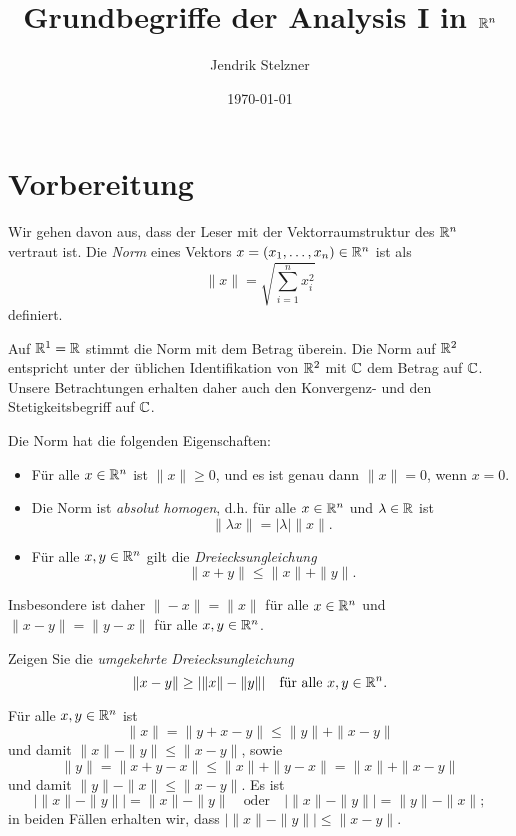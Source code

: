 \documentclass[a4paper,10pt]{article}
\title{Grundbegriffe der Analysis I in $\mathbb{R}^n$}
\author{Jendrik Stelzner}
\date{\today}
\begin{document}
\maketitle


\tableofcontents





\section{Vorbereitung}


Wir gehen davon aus, dass der Leser mit der Vektorraumstruktur des $\mathbb{R}^n$ vertraut ist. Die \emph{Norm} eines Vektors $x = (x_1, \dotsc, x_n) \in \mathbb{R}^n$ ist als
\[
 \|x\| = \sqrt{\sum_{i=1}^n x_i^2}
\]
definiert.

Auf $\mathbb{R}^1 = \mathbb{R}$ stimmt die Norm mit dem Betrag überein. Die Norm auf $\mathbb{R}^2$ entspricht unter der üblichen Identifikation von $\mathbb{R}^2$ mit $\mathbb{C}$ dem Betrag auf $\mathbb{C}$. Unsere Betrachtungen erhalten daher auch den Konvergenz- und den Stetigkeitsbegriff auf $\mathbb{C}$.


Die Norm hat die folgenden Eigenschaften:
\begin{itemize}
 \item
  Für alle $x \in \mathbb{R}^n$ ist $\|x\| \geq 0$, und es ist genau dann $\|x\| = 0$, wenn $x = 0$.
 \item
  Die Norm ist \emph{absolut homogen}, d.h. für alle $x \in \mathbb{R}^n$ und $\lambda \in \mathbb{R}$ ist
  \[
   \|\lambda x\| = |\lambda| \|x\|.
  \]
 \item
  Für alle $x,y \in \mathbb{R}^n$ gilt die \emph{Dreiecksungleichung}
  \[
   \|x+y\| \leq \|x\| + \|y\|.
  \]
\end{itemize}


Insbesondere ist daher $\|-x\| = \|x\|$ für alle $x \in \mathbb{R}^n$ und $\|x-y\| = \|y-x\|$ für alle $x, y \in \mathbb{R}^n$.


\begin{question}
 Zeigen Sie die \emph{umgekehrte Dreiecksungleichung}
 \[
  \|x-y\| \geq |\|x\|-\|y\|| \quad \text{für alle $x,y \in \mathbb{R}^n$}.
 \]
\end{question}
\begin{solution}
 Für alle $x,y \in \mathbb{R}^n$ ist
 \[
  \|x\| = \|y+x-y\| \leq \|y\| + \|x-y\|
 \]
 und damit $\|x\|-\|y\| \leq \|x-y\|$, sowie
 \[
  \|y\| = \|x+y-x\| \leq \|x\| + \|y-x\| = \|x\| + \|x-y\|
 \]
 und damit $\|y\|-\|x\| \leq \|x-y\|$. Es ist
 \[
  |\|x\|-\|y\|| = \|x\|-\|y\|
  \quad
  \text{oder}
  \quad
  |\|x\|-\|y\|| = \|y\|-\|x\|;
 \]
 in beiden Fällen erhalten wir, dass $|\|x\|-\|y\|| \leq \|x-y\|$.
\end{solution}
\end{document}
